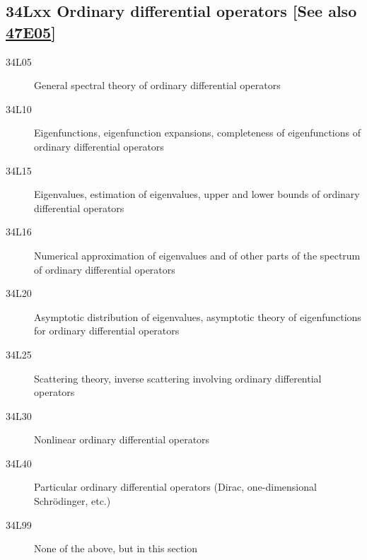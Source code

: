 \documentclass[letterpaper]{article}
\begin{document}
\subsection*{34Lxx  Ordinary differential operators [See also \hyperref[47E05]{47E05}] }\label{34Lxx}
\begin{description}  
\item [34L05]\label{34L05} General spectral theory of ordinary differential operators
\item [34L10]\label{34L10} Eigenfunctions, eigenfunction expansions, completeness of eigenfunctions of ordinary differential operators
\item [34L15]\label{34L15} Eigenvalues, estimation of eigenvalues, upper and lower bounds of ordinary differential operators
\item [34L16]\label{34L16} Numerical approximation of eigenvalues and of other parts of the spectrum of ordinary differential operators
\item [34L20]\label{34L20} Asymptotic distribution of eigenvalues, asymptotic theory of eigenfunctions for ordinary differential operators
\item [34L25]\label{34L25} Scattering theory, inverse scattering involving ordinary differential operators
\item [34L30]\label{34L30} Nonlinear ordinary differential operators
\item [34L40]\label{34L40} Particular ordinary differential  operators (Dirac, one-dimensional Schr\"{o}dinger, etc.)
\item [34L99]\label{34L99} None of the above, but in this section
\end{description}
\end{document}

